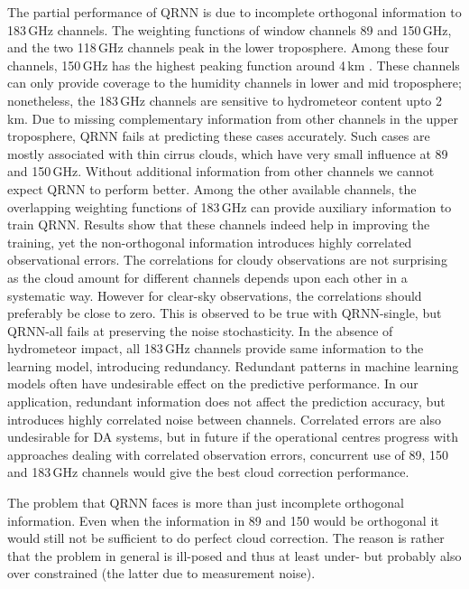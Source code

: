 \documentclass[amt, manuscript]{copernicus}
\newcommand{\todo}[1]{{\color{red} #1}}
\begin{document}
The partial performance of QRNN is due to incomplete orthogonal information to 183\,GHz channels. The weighting functions of window channels 89 and 150\,GHz, and the two 118\,GHz channels peak in the lower troposphere. Among these four channels, 150\,GHz has the highest peaking function around 4\,km \citep{chen2020mwhs}. These channels can only provide coverage to the humidity channels in lower and mid troposphere; nonetheless, the 183\,GHz channels are sensitive to hydrometeor content upto 2\,km. Due to missing complementary information from other channels in the upper troposphere, QRNN fails at predicting these cases accurately. Such cases are mostly associated with thin cirrus clouds, which have very small influence at 89 and 150\,GHz. Without additional information from other channels we cannot expect QRNN to perform better. Among the other available channels, the overlapping weighting functions of 183\,GHz can provide auxiliary information to train QRNN. Results show that these channels indeed help in improving the training, yet the non-orthogonal information introduces highly correlated observational errors. The correlations for cloudy observations are not surprising as the cloud amount for different channels depends upon each other in a systematic way. However for clear-sky observations, the correlations should preferably be close to zero. This is observed to be true with QRNN-single, but QRNN-all fails at preserving the noise stochasticity. In the absence of hydrometeor impact, all 183\,GHz channels provide same information to the learning model, introducing redundancy. Redundant patterns in machine learning models often have undesirable effect on the predictive performance. In our application, redundant information does not affect the prediction accuracy, but introduces highly correlated noise between channels. Correlated errors are also undesirable for DA systems, but in future if the operational centres progress with approaches dealing with correlated observation errors, concurrent use of 89, 150 and 183\,GHz channels would give the best cloud correction performance.


\todo{
    The problem that QRNN faces is more than just incomplete orthogonal information. Even when the information
    in 89 and 150 would be orthogonal it would still not be sufficient to do perfect cloud correction. The reason
    is rather that the problem in general is ill-posed and thus at least under- but probably also over constrained
    (the latter due to measurement noise). 
  }
\end{document}

